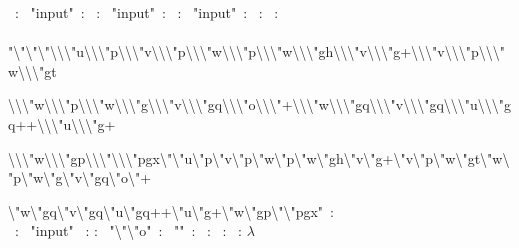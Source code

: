 \begin{smurf}
\footnotesize
\StmInput~: \StmPush~"input"~: \StmPut~: \StmPush~"input"~: \StmGet~:
\StmPush~"input"~: \StmGet~: \StmQuotify~:\\ \StmPush~
"\textbackslash{}"\textbackslash{}"\textbackslash{}"\textbackslash{}\textbackslash{}\textbackslash{}"u\textbackslash{}\textbackslash{}\textbackslash{}"p\textbackslash{}\textbackslash{}\textbackslash{}"v\textbackslash{}\textbackslash{}\textbackslash{}"p\textbackslash{}\textbackslash{}\textbackslash{}"w\textbackslash{}\textbackslash{}\textbackslash{}"p\textbackslash{}\textbackslash{}\textbackslash{}"w\textbackslash{}\textbackslash{}\textbackslash{}"gh\textbackslash{}\textbackslash{}\textbackslash{}"v\textbackslash{}\textbackslash{}\textbackslash{}"g+\textbackslash{}\textbackslash{}\textbackslash{}"v\textbackslash{}\textbackslash{}\textbackslash{}"p\textbackslash{}\textbackslash{}\textbackslash{}"w\textbackslash{}\textbackslash{}\textbackslash{}"gt

\textbackslash{}\textbackslash{}\textbackslash{}"w\textbackslash{}\textbackslash{}\textbackslash{}"p\textbackslash{}\textbackslash{}\textbackslash{}"w\textbackslash{}\textbackslash{}\textbackslash{}"g\textbackslash{}\textbackslash{}\textbackslash{}"v\textbackslash{}\textbackslash{}\textbackslash{}"gq\textbackslash{}\textbackslash{}\textbackslash{}"o\textbackslash{}\textbackslash{}\textbackslash{}"+\textbackslash{}\textbackslash{}\textbackslash{}"w\textbackslash{}\textbackslash{}\textbackslash{}"gq\textbackslash{}\textbackslash{}\textbackslash{}"v\textbackslash{}\textbackslash{}\textbackslash{}"gq\textbackslash{}\textbackslash{}\textbackslash{}"u\textbackslash{}\textbackslash{}\textbackslash{}"gq++\textbackslash{}\textbackslash{}\textbackslash{}"u\textbackslash{}\textbackslash{}\textbackslash{}"g+

\textbackslash{}\textbackslash{}\textbackslash{}"w\textbackslash{}\textbackslash{}\textbackslash{}"gp\textbackslash{}\textbackslash{}\textbackslash{}"\textbackslash{}\textbackslash{}\textbackslash{}"pgx\textbackslash{}"\textbackslash{}"u\textbackslash{}"p\textbackslash{}"v\textbackslash{}"p\textbackslash{}"w\textbackslash{}"p\textbackslash{}"w\textbackslash{}"gh\textbackslash{}"v\textbackslash{}"g+\textbackslash{}"v\textbackslash{}"p\textbackslash{}"w\textbackslash{}"gt\textbackslash{}"w\textbackslash{}"p\textbackslash{}"w\textbackslash{}"g\textbackslash{}"v\textbackslash{}"gq\textbackslash{}"o\textbackslash{}"+

\textbackslash{}"w\textbackslash{}"gq\textbackslash{}"v\textbackslash{}"gq\textbackslash{}"u\textbackslash{}"gq++\textbackslash{}"u\textbackslash{}"g+\textbackslash{}"w\textbackslash{}"gp\textbackslash{}"\textbackslash{}"pgx"~:
\\
\StmCat~: \StmPush~"input" \StmGet~: \StmPut
: \StmPush~"\textbackslash{}"\textbackslash{}"o"~: \StmPush~""~: \StmPut~:
\StmGet~: \StmExec~: $\lambda$

\end{smurf}